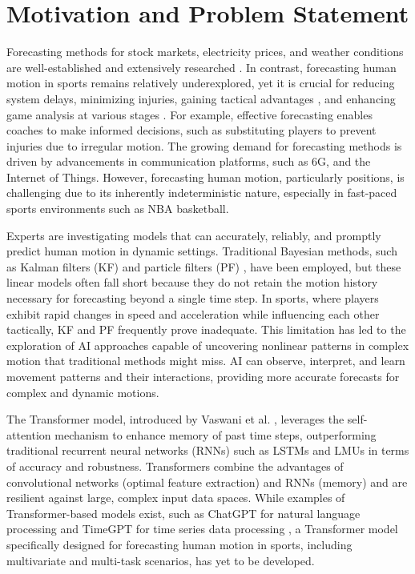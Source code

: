
\section{Motivation and Problem Statement}
\label{sec:motivation}

Forecasting methods for stock markets, electricity prices, and weather conditions are well-established and extensively researched \cite{rapach2020, ribeiro2021, mills2019}. In contrast, forecasting human motion in sports remains relatively underexplored, yet it is crucial for reducing system delays, minimizing injuries, gaining tactical advantages \cite{advantages1}, and enhancing game analysis at various stages \cite{postgame}. For example, effective forecasting enables coaches to make informed decisions, such as substituting players to prevent injuries due to irregular motion. The growing demand for forecasting methods is driven by advancements in communication platforms, such as 6G, and the Internet of Things. However, forecasting human motion, particularly positions, is challenging due to its inherently indeterministic nature, especially in fast-paced sports environments such as NBA basketball.

Experts are investigating models that can accurately, reliably, and promptly predict human motion in dynamic settings. Traditional Bayesian methods, such as Kalman filters (KF) and particle filters (PF) \cite{diss_tobi}, have been employed, but these linear models often fall short because they do not retain the motion history necessary for forecasting beyond a single time step. In sports, where players exhibit rapid changes in speed and acceleration while influencing each other tactically, KF and PF frequently prove inadequate. This limitation has led to the exploration of AI approaches capable of uncovering nonlinear patterns in complex motion that traditional methods might miss. AI can observe, interpret, and learn movement patterns and their interactions, providing more accurate forecasts for complex and dynamic motions.

The Transformer model, introduced by Vaswani et al. \cite{transformer}, leverages the self-attention mechanism to enhance memory of past time steps, outperforming traditional recurrent neural networks (RNNs) such as LSTMs \cite{lstm} and LMUs \cite{lmu} in terms of accuracy and robustness. Transformers combine the advantages of convolutional networks (optimal feature extraction) and RNNs (memory) and are resilient against large, complex input data spaces. While examples of Transformer-based models exist, such as ChatGPT for natural language processing \cite{gpt} and TimeGPT for time series data processing \cite{timegpt}, a Transformer model specifically designed for forecasting human motion in sports, including multivariate and multi-task scenarios, has yet to be developed.

